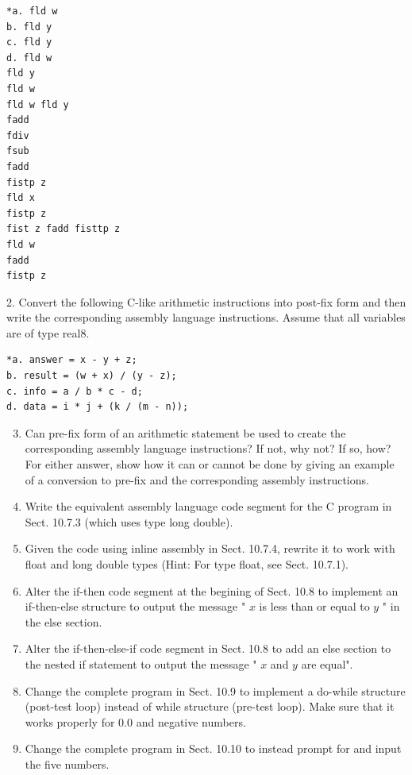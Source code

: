 \documentclass[10pt]{book}
\begin{document}
\begin{verbatim}
*a. fld w
b. fld y
c. fld y
d. fld w
fld y
fld w
fld w fld y
fadd
fdiv
fsub
fadd
fistp z
fld x
fistp z
fist z fadd fisttp z
fld w
fadd
fistp z
\end{verbatim}

2. Convert the following C-like arithmetic instructions into post-fix form and then write the corresponding assembly language instructions. Assume that all variables are of type real8.

\begin{verbatim}
*a. answer = x - y + z;
b. result = (w + x) / (y - z);
c. info = a / b * c - d;
d. data = i * j + (k / (m - n));
\end{verbatim}

\begin{enumerate}
  \setcounter{enumi}{2}
  \item Can pre-fix form of an arithmetic statement be used to create the corresponding assembly language instructions? If not, why not? If so, how? For either answer, show how it can or cannot be done by giving an example of a conversion to pre-fix and the corresponding assembly instructions.
  \item Write the equivalent assembly language code segment for the C program in Sect. 10.7.3 (which uses type long double).
  \item Given the code using inline assembly in Sect. 10.7.4, rewrite it to work with float and long double types (Hint: For type float, see Sect. 10.7.1).
  \item Alter the if-then code segment at the begining of Sect. 10.8 to implement an if-then-else structure to output the message " $x$ is less than or equal to $y$ " in the else section.
  \item Alter the if-then-else-if code segment in Sect. 10.8 to add an else section to the nested if statement to output the message " $x$ and $y$ are equal".
  \item Change the complete program in Sect. 10.9 to implement a do-while structure (post-test loop) instead of while structure (pre-test loop). Make sure that it works properly for 0.0 and negative numbers.
  \item Change the complete program in Sect. 10.10 to instead prompt for and input the five numbers.
\end{enumerate}
\end{document}
